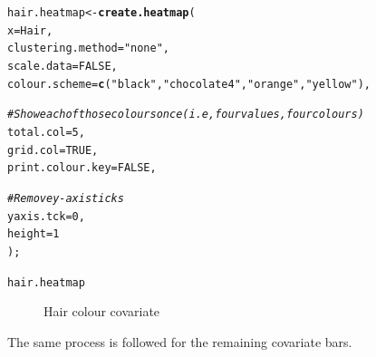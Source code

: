 \documentclass[letterpaper]{article}\usepackage[]{graphicx}\usepackage[]{color}
\makeatletter
\newcommand{\hlnum}[1]{\textcolor[rgb]{0.686,0.059,0.569}{#1}}%
\newcommand{\hlstr}[1]{\textcolor[rgb]{0.192,0.494,0.8}{#1}}%
\newcommand{\hlcom}[1]{\textcolor[rgb]{0.678,0.584,0.686}{\textit{#1}}}%
\newcommand{\hlstd}[1]{\textcolor[rgb]{0.345,0.345,0.345}{#1}}%
\newcommand{\hlkwb}[1]{\textcolor[rgb]{0.69,0.353,0.396}{#1}}%
\newcommand{\hlkwc}[1]{\textcolor[rgb]{0.333,0.667,0.333}{#1}}%
\newcommand{\hlkwd}[1]{\textcolor[rgb]{0.737,0.353,0.396}{\textbf{#1}}}%
\newenvironment{kframe}{%
 \def\at@end@of@kframe{}%
 \ifinner\ifhmode%
  \def\at@end@of@kframe{\end{minipage}}%
  \begin{minipage}{\columnwidth}%
 \fi\fi%
 \def\FrameCommand##1{\hskip\@totalleftmargin \hskip-\fboxsep
 \colorbox{shadecolor}{##1}\hskip-\fboxsep
     \hskip-\linewidth \hskip-\@totalleftmargin \hskip\columnwidth}%
 \MakeFramed {\advance\hsize-\width
   \@totalleftmargin\z@ \linewidth\hsize
   \@setminipage}}%
 {\par\unskip\endMakeFramed%
 \at@end@of@kframe}
\newenvironment{knitrout}{}{} %
\makeatother
\begin{document}
\begin{knitrout}
\color{fgcolor}\begin{kframe}
\begin{alltt}
\hlstd{hair.heatmap} \hlkwb{<-} \hlkwd{create.heatmap}\hlstd{(}
        \hlkwc{x} \hlstd{= Hair,}
        \hlkwc{clustering.method} \hlstd{=} \hlstr{"none"}\hlstd{,}
        \hlkwc{scale.data} \hlstd{=} \hlnum{FALSE}\hlstd{,}
        \hlkwc{colour.scheme} \hlstd{=} \hlkwd{c}\hlstd{(}\hlstr{"black"}\hlstd{,} \hlstr{"chocolate4"}\hlstd{,} \hlstr{"orange"}\hlstd{,} \hlstr{"yellow"}\hlstd{),}

        \hlcom{# Show each of those colours once (i.e, four values, four colours)}
        \hlkwc{total.col} \hlstd{=} \hlnum{5}\hlstd{,}
        \hlkwc{grid.col} \hlstd{=} \hlnum{TRUE}\hlstd{,}
        \hlkwc{print.colour.key} \hlstd{=} \hlnum{FALSE}\hlstd{,}

        \hlcom{# Remove y-axis ticks}
        \hlkwc{yaxis.tck} \hlstd{=} \hlnum{0}\hlstd{,}
        \hlkwc{height} \hlstd{=} \hlnum{1}
        \hlstd{);}

\hlstd{hair.heatmap}
\end{alltt}
\end{kframe}\begin{figure}[]


{\centering {} 

}

\caption[Hair colour covariate]{Hair colour covariate\label{fig:multiplotex1_cov1}}
\end{figure}


\end{knitrout}

The same process is followed for the remaining covariate bars.
\end{document}
